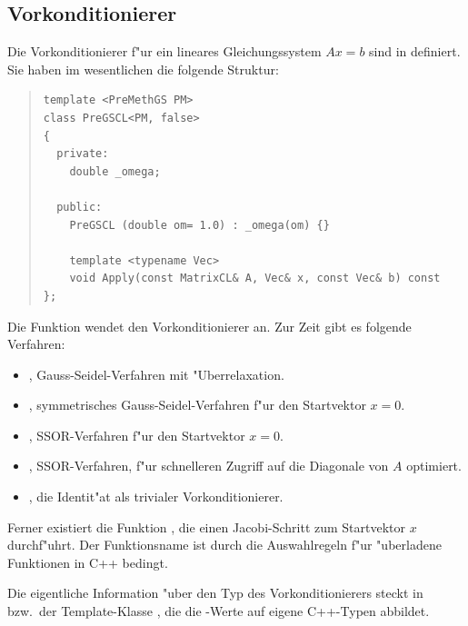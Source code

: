 \documentclass[11pt,a4paper]{article}
\newenvironment{Code}{\begin{quote}\scriptsize}{\end{quote}}
\begin{document}
\subsection{Vorkonditionierer}
\label{ss:vorkonditionierer}
Die Vorkonditionierer f"ur ein lineares Gleichungssystem $Ax=b$ sind
in  definiert. Sie haben im wesentlichen die folgende
Struktur:
\begin{Code}
\begin{verbatim}
template <PreMethGS PM>
class PreGSCL<PM, false>
{
  private:
    double _omega;

  public:
    PreGSCL (double om= 1.0) : _omega(om) {}

    template <typename Vec>
    void Apply(const MatrixCL& A, Vec& x, const Vec& b) const
};
\end{verbatim}
\end{Code}
Die Funktion  wendet den Vorkonditionierer an. Zur Zeit gibt
es folgende Verfahren:
\begin{itemize}
\item {}, Gauss-Seidel-Verfahren mit "Uberrelaxation.
\item {}, symmetrisches Gauss-Seidel-Verfahren f"ur den Startvektor $x=0$. 
\item {}, SSOR-Verfahren f"ur den Startvektor $x=0$.
\item {}, SSOR-Verfahren, f"ur schnelleren Zugriff auf die Diagonale von $A$ optimiert.
\item {}, die Identit"at als trivialer Vorkonditionierer.
\end{itemize}
Ferner existiert die Funktion , die einen Jacobi-Schritt zum Startvektor $x$ durchf"uhrt. Der
Funktionsname ist durch die Auswahlregeln f"ur "uberladene Funktionen
in C++ bedingt.

Die eigentliche Information "uber den Typ des Vorkonditionierers steckt in
 bzw.\ der Template-Klasse , die die -Werte auf eigene C++-Typen
abbildet.
\end{document}
